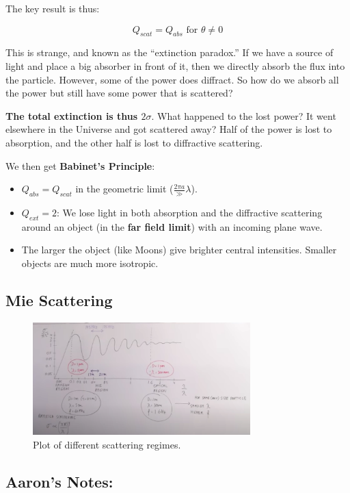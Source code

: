 \documentclass{article}
\begin{document}
The key result is thus:

$$
Q_{scat} = Q_{abs} \text{ for } \theta \neq 0
$$

This is strange, and known as the ``extinction paradox.'' If we have a source of light and place a big absorber in front of it, then we directly absorb the flux into the particle. However, some of the power does diffract. So how do we absorb all the power but still have some power that is scattered?

\textbf{The total extinction is thus $2\sigma$}. What happened to the lost power? It went elsewhere in the Universe and got scattered away? Half of the power is lost to absorption, and the other half is lost to diffractive scattering. 

We then get \textbf{Babinet's Principle}:
\begin{itemize}
    \item $Q_{abs} = Q_{scat}$ in the geometric limit ($\frac{2\pi a} \gg \lambda$).
    \item $Q_{ext} = 2$: We lose light in both absorption and the diffractive scattering around an object (in the \textbf{far field limit}) with an incoming plane wave. 
    \item The larger the object (like Moons) give brighter central intensities. Smaller objects are much more isotropic. 
\end{itemize}


\subsection{Mie Scattering}

\begin{figure}[h]
    \centering
    \includegraphics[width=0.75\textwidth]{Screen Shot 2020-11-14 at 6.32.32 PM.png}
    \caption{Plot of different scattering regimes. }
    \label{fig:regis}
\end{figure}

\subsection{Aaron's Notes:}
\end{document}
